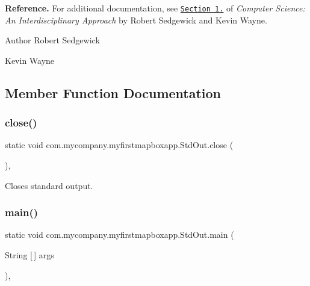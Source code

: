 {\bfseries Reference.} For additional documentation, see \href{http://introcs.cs.princeton.edu/15inout}{\tt Section 1.} of {\itshape Computer Science\+: An Interdisciplinary Approach} by Robert Sedgewick and Kevin Wayne.

\begin{DoxyAuthor}{Author}
Robert Sedgewick 

Kevin Wayne 
\end{DoxyAuthor}


\subsection{Member Function Documentation}
\mbox{\label{classcom_1_1mycompany_1_1myfirstmapboxapp_1_1_std_out_aef708ae79dc66deef01b3d67d3d3bc0f}} 
\subsubsection{\texorpdfstring{close()}{close()}}
{\footnotesize\ttfamily static void com.\+mycompany.\+myfirstmapboxapp.\+Std\+Out.\+close (\begin{DoxyParamCaption}{ }\end{DoxyParamCaption})\hspace{0.3cm}{\ttfamily [inline]}, {\ttfamily [static]}}

Closes standard output. \mbox{\label{classcom_1_1mycompany_1_1myfirstmapboxapp_1_1_std_out_a8ce973bcd3142601f1deeb0cb867a4e7}} 
\subsubsection{\texorpdfstring{main()}{main()}}
{\footnotesize\ttfamily static void com.\+mycompany.\+myfirstmapboxapp.\+Std\+Out.\+main (\begin{DoxyParamCaption}\item[{String \mbox{[}$\,$\mbox{]}}]{args }\end{DoxyParamCaption})\hspace{0.3cm}{\ttfamily [inline]}, {\ttfamily [static]}}

